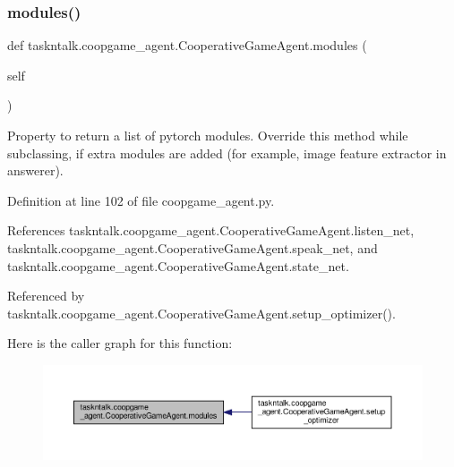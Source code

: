 \subsubsection{\texorpdfstring{modules()}{modules()}}
{\footnotesize\ttfamily def taskntalk.\+coopgame\+\_\+agent.\+Cooperative\+Game\+Agent.\+modules (\begin{DoxyParamCaption}\item[{}]{self }\end{DoxyParamCaption})}

\begin{DoxyVerb}Property to return a list of pytorch modules. Override this method
while subclassing, if extra modules are added (for example, image
feature extractor in answerer).
\end{DoxyVerb}
 

Definition at line 102 of file coopgame\+\_\+agent.\+py.



References taskntalk.\+coopgame\+\_\+agent.\+Cooperative\+Game\+Agent.\+listen\+\_\+net, taskntalk.\+coopgame\+\_\+agent.\+Cooperative\+Game\+Agent.\+speak\+\_\+net, and taskntalk.\+coopgame\+\_\+agent.\+Cooperative\+Game\+Agent.\+state\+\_\+net.



Referenced by taskntalk.\+coopgame\+\_\+agent.\+Cooperative\+Game\+Agent.\+setup\+\_\+optimizer().

Here is the caller graph for this function\+:
\nopagebreak
\begin{figure}[H]
\begin{center}
\leavevmode
\includegraphics[width=350pt]{classtaskntalk_1_1coopgame__agent_1_1CooperativeGameAgent_a648878b4ec58602fb0b8d13cd119ded3_icgraph}
\end{center}
\end{figure}
\mbox{\label{classtaskntalk_1_1coopgame__agent_1_1CooperativeGameAgent_aa3bad16932f23c0f55370d01000474ee}} 
